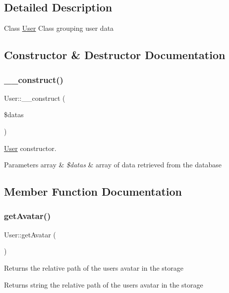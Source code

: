 \subsection{Detailed Description}
Class \hyperlink{classUser}{User} Class grouping user data 

\subsection{Constructor \& Destructor Documentation}
\mbox{\label{classUser_a962fbe0cd4ec9a5f4bb47a5dff80450c}} 
\subsubsection{\texorpdfstring{\+\_\+\+\_\+construct()}{\_\_construct()}}
{\footnotesize\ttfamily User\+::\+\_\+\+\_\+construct (\begin{DoxyParamCaption}\item[{}]{\$datas }\end{DoxyParamCaption})}

\hyperlink{classUser}{User} constructor. 
\begin{DoxyParams}[1]{Parameters}
array & {\em \$datas} & array of data retrieved from the database \\
\hline
\end{DoxyParams}


\subsection{Member Function Documentation}
\mbox{\label{classUser_a40a44c81f2ba62b1045edda618ae029d}} 
\subsubsection{\texorpdfstring{get\+Avatar()}{getAvatar()}}
{\footnotesize\ttfamily User\+::get\+Avatar (\begin{DoxyParamCaption}{ }\end{DoxyParamCaption})}

Returns the relative path of the user\textquotesingle{}s avatar in the storage \begin{DoxyReturn}{Returns}
string the relative path of the user\textquotesingle{}s avatar in the storage 
\end{DoxyReturn}
\mbox{\label{classUser_a3310fd79fdb53a61c3270fe5b533e0d9}} 
